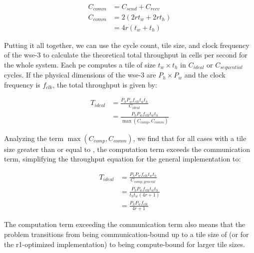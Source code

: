\begin{equation}
    \label{eq:c_comm}
    \begin{aligned}
        C_{comm} &= C_{send} + C_{recv} \\[1ex]
        C_{comm} &= 2\left(2 r t_w + 2 r t_h\right) \\[1ex]
        &= 4r\left(t_w+t_h\right)
    \end{aligned}
\end{equation}

Putting it all together, we can use the cycle count, tile size, and clock frequency of the \ac{wse}-3 to calculate the theoretical total throughput in cells per second for the whole system. Each \ac{pe} computes a tile of size $t_w \times t_h$ in $C_{ideal}$ or $C_{sequential}$ cycles. If the physical dimensions of the \ac{wse}-3 are $P_h \times P_w$ and the clock frequency is $f_{clk}$, the total throughput is given by:

\begin{equation}
    \label{eq:throughput_ideal}
    \begin{aligned}
        T_{ideal} &= \frac{P_h P_w f_{clk} t_w t_h}{C_{ideal}} \\[1ex]
        &= \frac{P_h P_w f_{clk} t_w t_h}{\max\left(C_{comp}, C_{comm}\right)}
    \end{aligned}
\end{equation}

Analyzing the term $\max\left(C_{comp}, C_{comm}\right)$, we find that for all cases with a tile size greater than or equal to , the computation term exceeds the communication term, simplifying the throughput equation for the general implementation to:

\begin{equation}
    \label{eq:throughput_ideal_simplified}
    \begin{aligned}
        T_{ideal} &= \frac{P_h P_w f_{clk} t_w t_h}{C_{comp,general}} \\[1ex]
        &= \frac{P_h P_w f_{clk} t_w t_h}{t_h t_w \left(4r + 1\right)} \\[1ex]
        &= \frac{P_h P_w f_{clk}}{4r + 1}
    \end{aligned}
\end{equation}

The computation term exceeding the communication term also means that the problem transitions from being communication-bound up to a tile size of  (or  for the r1-optimized implementation) to being compute-bound for larger tile sizes.

